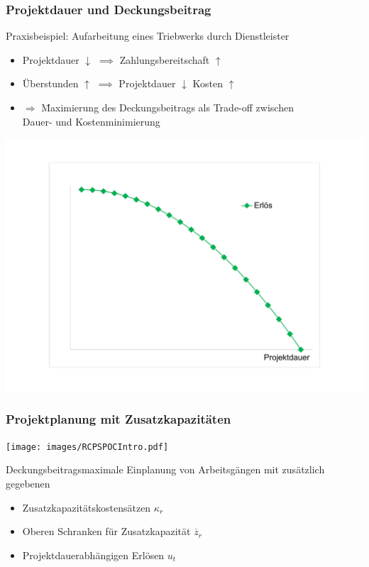 \begin{frame}
\frametitle{Projektdauer und Deckungsbeitrag}
\begin{small}
Praxisbeispiel: Aufarbeitung eines Triebwerks durch Dienstleister
\begin{itemize}
\item Projektdauer {\large $\downarrow$} $\implies$ Zahlungsbereitschaft {\large $\uparrow$\\}
\item Überstunden {\large $\uparrow$} $\implies$ Projektdauer {\large $\downarrow$} Kosten {\large $\uparrow$}\\
\item[] \begin{tabbing}
$\Rightarrow$ \= Maximierung des Deckungsbeitrags als Trade-off zwischen\\
\>Dauer- und Kostenminimierung
\end{tabbing}

\end{itemize}
\end{small}
\begin{center}
\includegraphics[page=3,scale=0.29]{images/ErloesKostenDeckungsbeitrag.pdf}
\end{center}
\end{frame}


\begin{frame}[t]
	\frametitle{Projektplanung mit Zusatzkapazitäten}
	\begin{center}
		\texttt{[image: images/RCPSPOCIntro.pdf]}\\
	\end{center}
	
	{\small
		Deckungsbeitragsmaximale Einplanung von Arbeitsgängen mit zusätzlich gegebenen
		\begin{itemize}
			\itemsep0em
			\item Zusatzkapazitätskostensätzen $\kappa_r$			
			\item Oberen Schranken für Zusatzkapazität $\overline{z}_r$
			\item Projektdauerabhängigen Erlösen $u_t$
		\end{itemize}
	}
\end{frame}

